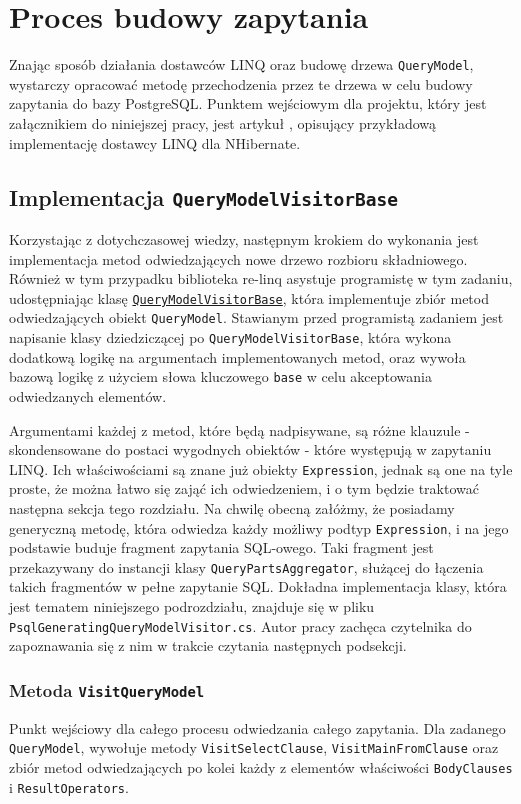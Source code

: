 \chapter{Proces budowy zapytania}
Znając sposób działania dostawców LINQ oraz budowę drzewa \texttt{QueryModel}, wystarczy opracować metodę przechodzenia przez te drzewa w celu budowy zapytania do bazy PostgreSQL. Punktem wejściowym dla projektu, który jest załącznikiem do niniejszej pracy, jest artykuł \cite{codeproject_nhibernate}, opisujący przykładową implementację dostawcy LINQ dla NHibernate.

\section{Implementacja \texttt{QueryModelVisitorBase}}
Korzystając z dotychczasowej wiedzy, następnym krokiem do wykonania jest implementacja metod odwiedzających nowe drzewo rozbioru składniowego. Również w tym przypadku biblioteka re-linq asystuje programistę w tym zadaniu, udostępniając klasę \href{https://github.com/re-motion/Relinq/blob/ab11f0997998a90e17e90dc58b215c3997d47311/Core/QueryModelVisitorBase.cs}{\texttt{QueryModelVisitorBase}}, która implementuje zbiór metod odwiedzających obiekt \texttt{QueryModel}. Stawianym przed programistą zadaniem jest napisanie klasy dziedziczącej po \texttt{QueryModelVisitorBase}, która wykona dodatkową logikę na argumentach implementowanych metod, oraz wywoła bazową logikę z użyciem słowa kluczowego \texttt{base} w celu akceptowania odwiedzanych elementów.

Argumentami każdej z metod, które będą nadpisywane, są różne klauzule - skondensowane do postaci wygodnych obiektów - które występują w zapytaniu LINQ. Ich właściwościami są znane już obiekty \texttt{Expression}, jednak są one na tyle proste, że można łatwo się zająć ich odwiedzeniem, i o tym będzie traktować następna sekcja tego rozdziału. Na chwilę obecną załóżmy, że posiadamy generyczną metodę, która odwiedza każdy możliwy podtyp \texttt{Expression}, i na jego podstawie buduje fragment zapytania SQL-owego. Taki fragment jest przekazywany do instancji klasy \texttt{QueryPartsAggregator}, służącej do łączenia takich fragmentów w pełne zapytanie SQL. Dokładna implementacja klasy, która jest tematem niniejszego podrozdziału, znajduje się w pliku \texttt{PsqlGeneratingQueryModelVisitor.cs}. Autor pracy zachęca czytelnika do zapoznawania się z nim w trakcie czytania następnych podsekcji.

\subsection{Metoda \texttt{VisitQueryModel}}
Punkt wejściowy dla całego procesu odwiedzania całego zapytania. Dla zadanego \texttt{QueryModel}, wywołuje metody \texttt{VisitSelectClause}, \texttt{VisitMainFromClause} oraz zbiór metod odwiedzających po kolei każdy z elementów właściwości \linebreak \texttt{BodyClauses} i \texttt{ResultOperators}.

